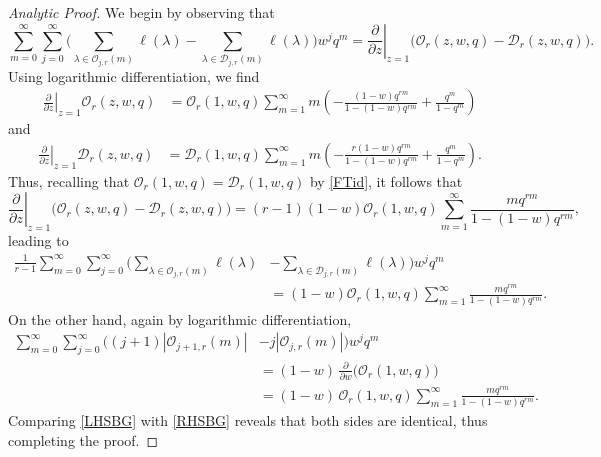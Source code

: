 \documentclass[reqno,12pt]{amsart}
\theoremstyle{definition}
\def\del{\partial}
\begin{document}
\begin{proof}[Analytic Proof] We begin by observing that
$$\sum_{m=0}^\infty\sum_{j=0}^\infty \Big(\sum_{\lambda\in\mathcal{O}_{j,r}(m)}\ell(\lambda)-\sum_{\lambda\in\mathcal{D}_{j,r}(m)}\ell(\lambda)\Big)w^jq^m  
= \left.\frac{\del}{\del z}\right|_{z=1}\!\!\!\!\!\!\bigl(\mathcal{O}_r(z,w,q)-\mathcal{D}_r(z,w,q)\bigr).$$ 
Using logarithmic differentiation, we find
\begin{align*}
\left.\frac{\del}{\del z}\right|_{z=1}\!\!\!\!\!\!\mathcal{O}_r(z,w,q)
&= \mathcal{O}_r(1,w,q)\sum_{m=1}^\infty m\left(
-\frac{(1-w)q^{rm}}{1-(1-w)q^{rm}}+\frac{q^{m}}{1-q^{m}}\right)
\end{align*}
and
\begin{align*}
\left.\frac{\del}{\del z}\right|_{z=1}\!\!\!\!\!\!\mathcal{D}_r(z,w,q)
&= \mathcal{D}_r(1,w,q)\sum_{m=1}^\infty m\left(
-\frac{r(1-w)q^{rm}}{1-(1-w)q^{rm}}+\frac{q^{m}}{1-q^{m}}\right).
\end{align*}
Thus, recalling that  $\mathcal{O}_r(1,w,q)=\mathcal{D}_r(1,w,q)$ by \eqref{FTid}, it follows  that
$$
\left.\frac{\del}{\del z}\right|_{z=1}\!\!\!\!\!\!
\bigl(\mathcal{O}_r(z,w,q)-\mathcal{D}_r(z,w,q)\bigr)=
(r-1)(1-w)\mathcal{O}_r(1,w,q)
\sum_{m=1}^\infty 
\frac{mq^{rm}}{1-(1-w)q^{rm}},$$
leading to
\begin{align}\label{LHSBG}
\frac{1}{r-1}\sum_{m=0}^\infty\sum_{j=0}^\infty \Big(\sum_{\lambda\in\mathcal{O}_{j,r}(m)}\ell(\lambda)&-\sum_{\lambda\in\mathcal{D}_{j,r}(m)}\ell(\lambda)\Big)w^jq^m 
\nonumber\\
&= (1-w)\mathcal{O}_r(1,w,q)
\sum_{m=1}^\infty 
\frac{mq^{rm}}{1-(1-w)q^{rm}}.
\end{align}
On the other hand, again by logarithmic differentiation,
\begin{align}\label{RHSBG}\sum_{m=0}^\infty\sum_{j=0}^\infty
\Big((j+1)\left|\mathcal{O}_{j+1,r}(m)\right|&-j\left|\mathcal{O}_{j,r}(m)\right|\Big)w^jq^m\nonumber\\
&=(1-w) \,
\frac{\del}{\del w}\bigl(\mathcal{O}_r(1,w,q)\bigr)\nonumber\\
&=(1-w)\,\mathcal{O}_r(1,w,q)\sum_{m=1}^{\infty}
\frac{mq^{rm}}{1-(1-w)q^{rm}}.
\end{align}
Comparing \eqref{LHSBG} with \eqref{RHSBG} reveals that both sides are identical, thus completing the proof.
\end{proof}
\end{document}
